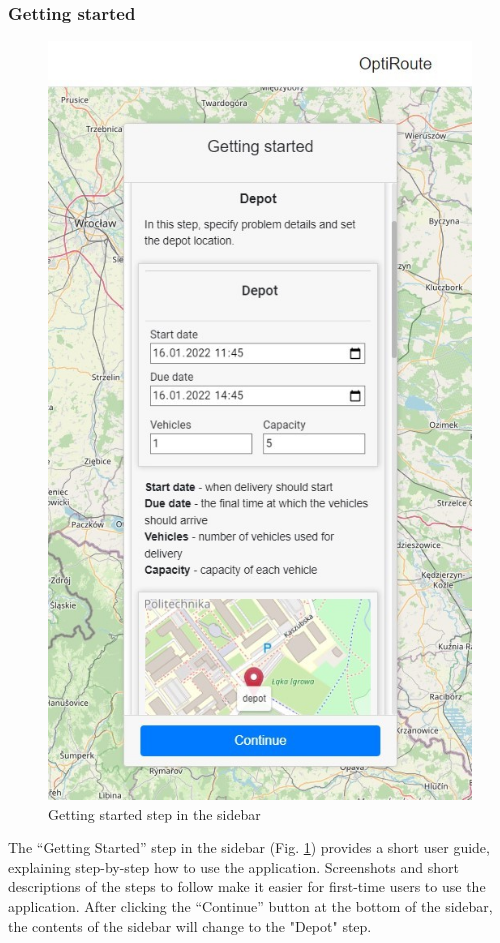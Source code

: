 \documentclass[a4paper,twoside,12pt]{book}
\begin{document}
\subsubsection{Getting started}
\begin{figure}[htb]
\centering
\includegraphics[scale=0.7]{images/gettingStarted_updated.jpg}
\caption{Getting started step in the sidebar}
\label{fig:gettingStarted}
\end{figure}
The ``Getting Started'' step in the sidebar (Fig. \ref{fig:gettingStarted}) provides a short user guide, explaining step-by-step how to use the application. Screenshots and short descriptions of the steps to follow make it easier for first-time users to use the application. After clicking the ``Continue'' button at the bottom of the sidebar, the contents of the sidebar will change to the "Depot" step.
\end{document}
